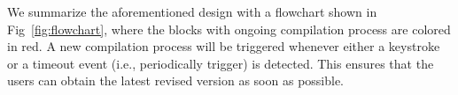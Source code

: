 \documentclass[sigconf]{acmart}
\begin{document}
We summarize the aforementioned design with a flowchart shown in Fig~\ref{fig:flowchart}, where the blocks with ongoing compilation process are colored in red. A new compilation process will be triggered whenever either a keystroke or a timeout event (i.e., periodically trigger) is detected. This ensures that the users can obtain the latest revised version as soon as possible.









\end{document}
